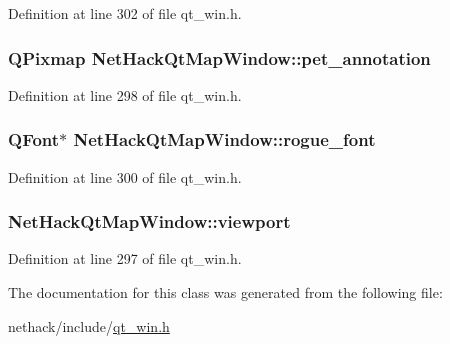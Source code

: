 Definition at line 302 of file qt\+\_\+win.\+h.

\hypertarget{classNetHackQtMapWindow_a426400108746c47f1aa6e1d262d01a67}{
\subsubsection[{pet\+\_\+annotation}]{\setlength{\rightskip}{0pt plus 5cm}Q\+Pixmap Net\+Hack\+Qt\+Map\+Window\+::pet\+\_\+annotation\hspace{0.3cm}{\ttfamily [private]}}}\label{classNetHackQtMapWindow_a426400108746c47f1aa6e1d262d01a67}


Definition at line 298 of file qt\+\_\+win.\+h.

\hypertarget{classNetHackQtMapWindow_aea4af4ef1c774e5d90126f793aa92eca}{
\subsubsection[{rogue\+\_\+font}]{\setlength{\rightskip}{0pt plus 5cm}Q\+Font$\ast$ Net\+Hack\+Qt\+Map\+Window\+::rogue\+\_\+font\hspace{0.3cm}{\ttfamily [private]}}}\label{classNetHackQtMapWindow_aea4af4ef1c774e5d90126f793aa92eca}


Definition at line 300 of file qt\+\_\+win.\+h.

\hypertarget{classNetHackQtMapWindow_a79a34e42d09f5a02a8a70a985e8d075c}{
\subsubsection[{viewport}]{ Net\+Hack\+Qt\+Map\+Window\+::viewport\hspace{0.3cm}{\ttfamily [private]}}}\label{classNetHackQtMapWindow_a79a34e42d09f5a02a8a70a985e8d075c}


Definition at line 297 of file qt\+\_\+win.\+h.



The documentation for this class was generated from the following file\+:\begin{DoxyCompactItemize}
\item 
nethack/include/\hyperlink{qt__win_8h}{qt\+\_\+win.\+h}\end{DoxyCompactItemize}
